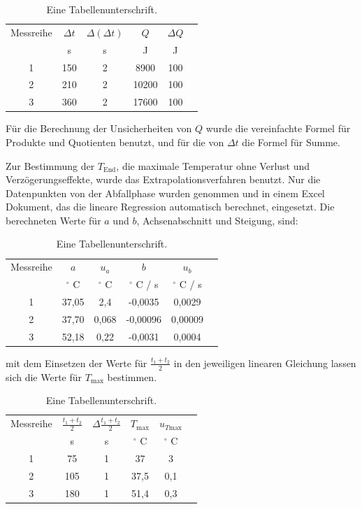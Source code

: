 \documentclass[11pt,a4paper]{article} %
\begin{document}
\begin{table}[h]
	\centering
	\begin{tabular*}{0.99\textwidth}{@{\extracolsep{\fill}}cccccc}
		\toprule
		Messreihe & $\Delta t$ & $\Delta(\Delta t)$ & $Q$ & $\Delta Q$  \\
		& s & s & J  & J  \\
		1 & 150 & 2 & 8900 & 100 \\
		2 & 210 & 2 & 10200 & 100 \\
		3 & 360 & 2 & 17600 & 100 \\
		\bottomrule
	\end{tabular*}
	\caption{Eine Tabellenunterschrift.}
	\label{tabelle}
\end{table}

Für die Berechnung der Unsicherheiten von $Q$ wurde die vereinfachte Formel für Produkte und Quotienten benutzt, und für die von $\Delta t$ die Formel für Summe. 

Zur Bestimmung der $T_\textrm{End}$, die maximale Temperatur ohne Verlust und Verzögerungseffekte, wurde das Extrapolationsverfahren benutzt. Nur die Datenpunkten von der Abfallphase wurden genommen und in einem Excel Dokument, das die lineare Regression automatisch berechnet,  eingesetzt. Die berechneten Werte für $a$ und $b$, Achsenabschnitt und Steigung, sind: 



\begin{table}[h]
	\centering
	\begin{tabular*}{0.99\textwidth}{@{\extracolsep{\fill}}cccccc}
		\toprule
		Messreihe & $a$ & $u_a$ & $b$ & $u_b$\\
		& $^\circ$ C & $^\circ$ C & $^\circ$ C / s & $^\circ$ C / s \\
		1 & 37,05 & 2,4 & -0,0035 & 0,0029 \\
		2 & 37,70& 0,068 & -0,00096 & 0,00009 \\
		3 & 52,18 & 0,22 & -0,0031 & 0,0004 \\
		\bottomrule
	\end{tabular*}
	\caption{Eine Tabellenunterschrift.}
	\label{tabelle2}
\end{table}

mit dem Einsetzen der Werte für $\frac{t_1+t_2}{2}$ in den jeweiligen linearen Gleichung lassen sich die Werte für $T_\textrm{max}$ bestimmen. 


\begin{table}[h]
	\centering
	\begin{tabular*}{0.99\textwidth}{@{\extracolsep{\fill}}cccccc}
		\toprule
		Messreihe & $\frac{t_1+t_2}{2}$ & $\Delta \frac{t_1+t_2}{2} $ &  $T_\textrm{max}$ & $u_{T \textrm{max}} $  \\
		& s & s & $^\circ$ C & $^\circ$ C \\
		1 & 75 & 1 & 37 & 3 \\
		2 & 105 & 1 & 37,5 & 0,1 \\
		3 & 180 & 1 & 51,4 & 0,3 \\
		\bottomrule
	\end{tabular*}
	\caption{Eine Tabellenunterschrift.}
	\label{tabelle3}
\end{table}
\end{document}
